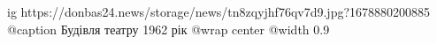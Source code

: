  
 
 
 
 

\ifcmt
  ig https://donbas24.news/storage/news/tn8zqyjhf76qv7d9.jpg?1678880200885
	@caption Будівля театру 1962 рік
  @wrap center
  @width 0.9
\fi

